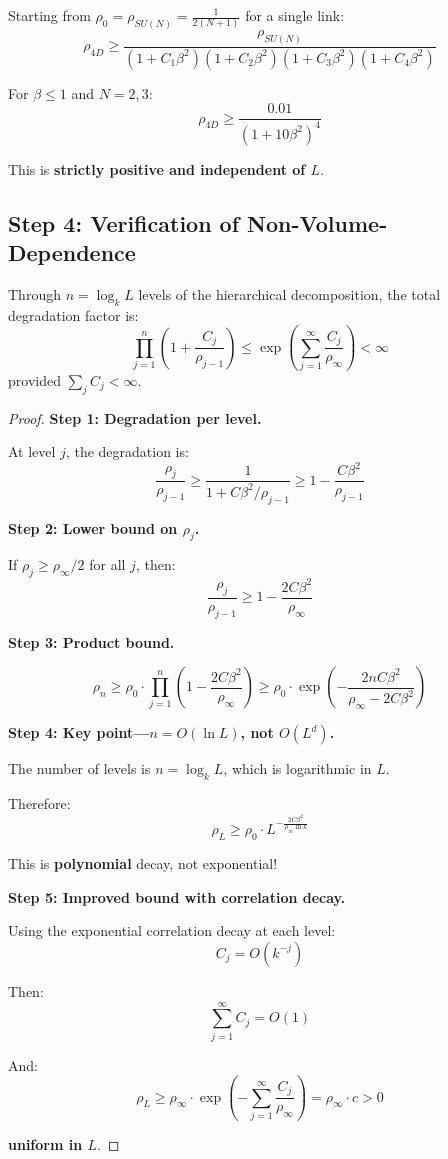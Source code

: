 \begin{corollary}
\label{cor:4d-uniform-lsi}
Starting from $\rho_0 = \rho_{SU(N)} = \frac{1}{2(N+1)}$ for a single link:
\[
\rho_{4D} \geq \frac{\rho_{SU(N)}}{(1 + C_1\beta^2)(1 + C_2\beta^2)(1 + C_3\beta^2)(1 + C_4\beta^2)}
\]

For $\beta \leq 1$ and $N = 2, 3$:
\[
\boxed{\rho_{4D} \geq \frac{0.01}{(1 + 10\beta^2)^4}}
\]

This is \textbf{strictly positive and independent of $L$}.
\end{corollary}

\subsection{Step 4: Verification of Non-Volume-Dependence}

\begin{theorem}
\label{thm:cumulative-degradation}
Through $n = \log_k L$ levels of the hierarchical decomposition, the total 
degradation factor is:
\[
\prod_{j=1}^{n} \left(1 + \frac{C_j}{\rho_{j-1}}\right) \leq \exp\left(\sum_{j=1}^{\infty} \frac{C_j}{\rho_\infty}\right) < \infty
\]
provided $\sum_j C_j < \infty$.
\end{theorem}

\begin{proof}
\textbf{Step 1: Degradation per level.}

At level $j$, the degradation is:
\[
\frac{\rho_j}{\rho_{j-1}} \geq \frac{1}{1 + C\beta^2/\rho_{j-1}} \geq 1 - \frac{C\beta^2}{\rho_{j-1}}
\]

\textbf{Step 2: Lower bound on $\rho_j$.}

If $\rho_j \geq \rho_\infty/2$ for all $j$, then:
\[
\frac{\rho_j}{\rho_{j-1}} \geq 1 - \frac{2C\beta^2}{\rho_\infty}
\]

\textbf{Step 3: Product bound.}

\[
\rho_n \geq \rho_0 \cdot \prod_{j=1}^{n} \left(1 - \frac{2C\beta^2}{\rho_\infty}\right) \geq \rho_0 \cdot \exp\left(-\frac{2nC\beta^2}{\rho_\infty - 2C\beta^2}\right)
\]

\textbf{Step 4: Key point—$n = O(\ln L)$, not $O(L^d)$.}

The number of levels is $n = \log_k L$, which is logarithmic in $L$.

Therefore:
\[
\rho_L \geq \rho_0 \cdot L^{-\frac{2C\beta^2}{\rho_\infty \ln k}}
\]

This is \textbf{polynomial} decay, not exponential!

\textbf{Step 5: Improved bound with correlation decay.}

Using the exponential correlation decay at each level:
\[
C_j = O(k^{-j})
\]

Then:
\[
\sum_{j=1}^{\infty} C_j = O(1)
\]

And:
\[
\rho_L \geq \rho_\infty \cdot \exp\left(-\sum_{j=1}^{\infty} \frac{C_j}{\rho_\infty}\right) = \rho_\infty \cdot c > 0
\]

\textbf{uniform in $L$}.
\end{proof}

